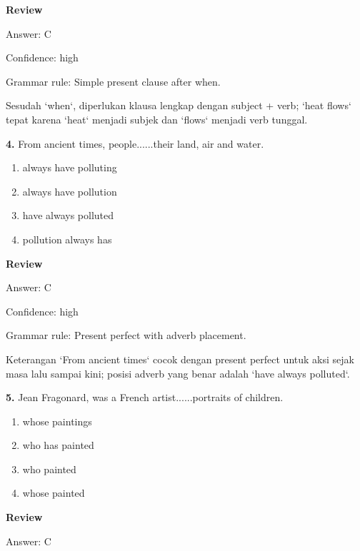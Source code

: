 \documentclass[12pt]{article}
\begin{document}
\par
\begingroup
\setlength{\parskip}{0pt}
\setlength{\parindent}{0pt}
\textbf{Review}\par
Answer: C\par
Confidence: high\par
Grammar rule: Simple present clause after when.\par
Sesudah `when`, diperlukan klausa lengkap dengan subject + verb; `heat flows` tepat karena `heat` menjadi subjek dan `flows` menjadi verb tunggal.\par
\endgroup
\par
\vspace{0.25\baselineskip}
\noindent\textbf{4.} From ancient times, people......their land, air and water.
\begin{enumerate}[label=(\Alph*),leftmargin=*,itemsep=0.2em]
\item always have polluting
\item always have pollution
\item have always polluted
\item pollution always has
\end{enumerate}
\par
\begingroup
\setlength{\parskip}{0pt}
\setlength{\parindent}{0pt}
\textbf{Review}\par
Answer: C\par
Confidence: high\par
Grammar rule: Present perfect with adverb placement.\par
Keterangan `From ancient times` cocok dengan present perfect untuk aksi sejak masa lalu sampai kini; posisi adverb yang benar adalah `have always polluted`.\par
\endgroup
\par
\vspace{0.25\baselineskip}
\noindent\textbf{5.} Jean Fragonard, was a French artist......portraits of children.
\begin{enumerate}[label=(\Alph*),leftmargin=*,itemsep=0.2em]
\item whose paintings
\item who has painted
\item who painted
\item whose painted
\end{enumerate}
\par
\begingroup
\setlength{\parskip}{0pt}
\setlength{\parindent}{0pt}
\textbf{Review}\par
Answer: C\par
\end{document}
